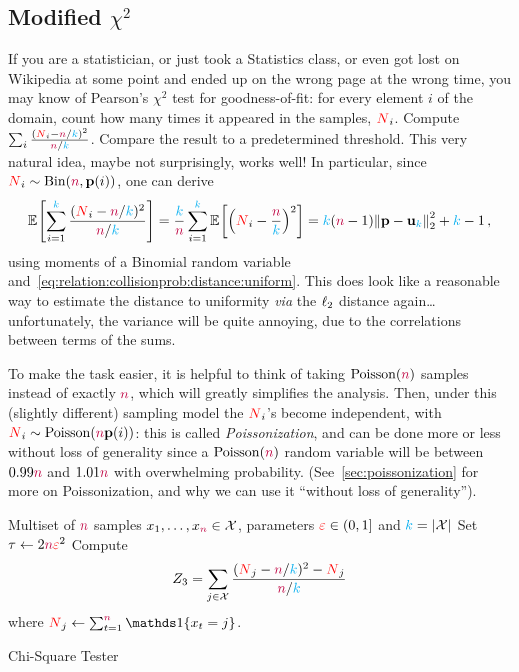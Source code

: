 \subsection{Modified $\chi^2$} If you are a statistician, or just took a Statistics class, or even got lost on Wikipedia at some point and ended up on the wrong page at the wrong time, you may know of Pearson's $\chi^2$ test for goodness-of-fit: for every element $i$ of the domain, count how many times it appeared in the samples, $\occur_i$. Compute $\sum_{i} \frac{(\occur_i-\ns/\ab)^2}{\ns/\ab}$. Compare the result to a predetermined threshold. This very natural idea, maybe not surprisingly, works well! In particular, since $\occur_i \sim \binomial{\ns}{\p(i)}$, one can derive
\[
\bEE{ \sum_{i=1}^\ab \frac{(\occur_i-\ns/\ab)^2}{\ns/\ab} } = \frac{\ab}{\ns}\sum_{i=1}^\ab \bEE{ \Paren{\occur_i-\frac{\ns}{\ab}}^2 } = \ab(\ns-1)\normtwo{\p-\uniform_\ab}^2 + \ab-1\,,
\]
using moments of a Binomial random variable and~\cref{eq:relation:collisionprob:distance:uniform}. This does look like a reasonable way to estimate the distance to uniformity \emph{via} the $\lp[2]$ distance again\dots{} unfortunately, the variance will be quite annoying, due to the correlations between terms of the sums.

To make the task easier, it is helpful to think of taking $\poisson{\ns}$ samples instead of exactly $\ns$, which will greatly simplifies the analysis. Then, under this (slightly different) sampling model the $\occur_i$'s become independent, with $\occur_i\sim\poisson{\ns\p(i)}$: this is called \emph{Poissonization}, and can be done more or less without loss of generality since a $\poisson{\ns}$ random variable will be between $0.99\ns$ and $1.01\ns$ with overwhelming probability. (See~\cref{sec:poissonization} for more on Poissonization, and why we can use it ``without loss of generality'').

\begin{algorithm}[ht!]
  \begin{algorithmic}[1]
    \Require Multiset of $\ns$ samples $x_1,\dots,x_\ns \in \domain$, parameters $\dst\in(0,1]$ and $\ab = \abs{\domain}$
    \State Set $\tau \gets 2\ns\dst^2$
    \State Compute 
    \[
        Z_3 = \sum_{j\in\domain} \frac{(\occur_j-\ns/\ab)^2-\occur_j}{\ns/\ab}
    \] where $\occur_j \gets \sum_{t=1}^\ns\indic{x_t=j}$.
     \Return \reject {}
    \Else\ 
      \Return \accept {}
    \EndIf
  \end{algorithmic}
  \caption{\label{algo:chisquare}\sc Chi-Square Tester}
\end{algorithm}

